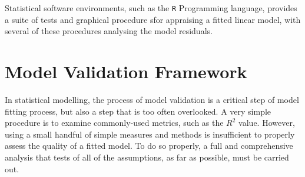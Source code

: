 \documentclass[12pt, a4paper]{article}
\begin{document}

Statistical software environments, such as the \texttt{R} Programming language, provides a suite of tests and graphical procedure sfor appraising a fitted linear model, with several 
of these procedures analysing the model residuals.



\newpage	%
\section{Model Validation Framework}
In statistical modelling, the process of model validation is a critical step of model fitting process, but also a step that is too often overlooked. A very simple procedure is to examine commonly-used
metrics, such as the $R^2$ value. However, using a small handful of simple measures and methods is insufficient to properly assess the quality of a fitted model. To do so properly, a full and comprehensive
analysis that tests of all of the assumptions, as far as possible, must be carried out.
\end{document}
